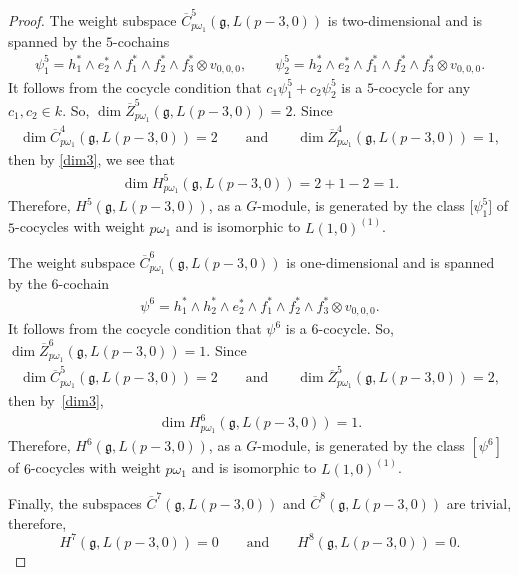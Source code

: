 \documentclass[pdftex]{sigma}%
\numberwithin{equation}{section}
\begin{document}
\begin{proof}
The weight subspace
$\overline{C}^5_{p\omega_1}(\mathfrak{g},L(p-3,0))$ is two-dimensional and is spanned by the $5$-cochains
\begin{gather*}
\psi^5_1=h_1^*\wedge e_2^*\wedge f_1^*\wedge f_2^*\wedge f_3^*\otimes v_{0,0,0},\qquad\psi^5_2=h_2^*\wedge e_2^*\wedge f_1^*\wedge f_2^*\wedge f_3^*\otimes v_{0,0,0}.
\end{gather*}
It follows from the cocycle condition that $c_1\psi^5_1+c_2\psi^5_2$ is a $5$-cocycle for any $c_1,c_2\in k$. So, $\dim \overline{Z}^5_{p\omega_1}(\mathfrak{g},L(p-3,0))=2$. Since
\begin{gather*}
\dim \overline{C}^4_{p\omega_1}(\mathfrak{g},L(p-3,0))=2\qquad\text{and}\qquad
\dim \overline{Z}^4_{p\omega_1}(\mathfrak{g},L(p-3,0))=1,
\end{gather*}
then by \eqref{dim3}, we see that
\begin{gather*}
\dim H^5_{p\omega_1}(\mathfrak{g},L(p-3,0))=2+1-2=1.
\end{gather*}
Therefore, $H^5(\mathfrak{g},L(p-3,0))$, as a $G$-module, is generated by the class $\big[\psi^5_1\big]$ of $5$-cocycles with weight $p\omega_1$ and is isomorphic to $L(1,0)^{(1)}$.

The weight subspace
$\overline{C}^6_{p\omega_1}(\mathfrak{g},L(p-3,0))$ is one-dimensional and is spanned by the $6$-cochain
\begin{gather*}
\psi^6=h_1^*\wedge h_2^*\wedge e_2^*\wedge f_1^*\wedge f_2^*\wedge f_3^*\otimes v_{0,0,0}.
\end{gather*}
It follows from the cocycle condition that $\psi^6$ is a $6$-cocycle. So, $\dim \overline{Z}^6_{p\omega_1}(\mathfrak{g},L(p-3,0))=1$. Since
\begin{gather*}
\dim \overline{C}^5_{p\omega_1}(\mathfrak{g},L(p-3,0))=2\qquad\text{and}\qquad
\dim \overline{Z}^5_{p\omega_1}(\mathfrak{g},L(p-3,0))=2,
\end{gather*}
then by~\eqref{dim3},
\begin{gather*}
\dim H^6_{p\omega_1}(\mathfrak{g},L(p-3,0))=1.
\end{gather*}
Therefore, $H^6(\mathfrak{g},L(p-3,0))$, as a $G$-module, is generated by the class $[\psi^6]$ of $6$-cocycles with weight $p\omega_1$ and is isomorphic to $L(1,0)^{(1)}$.

Finally, the subspaces $\overline{C}^7(\mathfrak{g},L(p-3,0))$ and $\overline{C}^8(\mathfrak{g},L(p-3,0))$ are trivial, therefore,
\begin{equation*}
H^7(\mathfrak{g},L(p-3,0))=0\qquad\text{and}\qquad H^8(\mathfrak{g},L(p-3,0))=0.
\end{equation*}
\renewcommand{\qed}{}
\end{proof}
\end{document}

